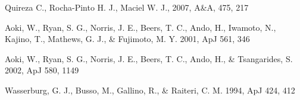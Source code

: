 Quireza C., Rocha-Pinto H. J., Maciel W. J., 2007, A\&A, 475, 217

 Aoki, W., Ryan, S. G., Norris, J. E., Beers, T. C., Ando, H., Iwamoto, N., Kajino, T., Mathews, G. J., \& Fujimoto, M. Y. 2001, ApJ 561, 346

 Aoki, W., Ryan, S. G., Norris, J. E., Beers, T. C., Ando, H., \& Tsangarides, S. 2002, ApJ 580, 1149 

 Wasserburg, G. J., Busso, M., Gallino, R., \& Raiteri, C. M. 1994, ApJ 424, 412